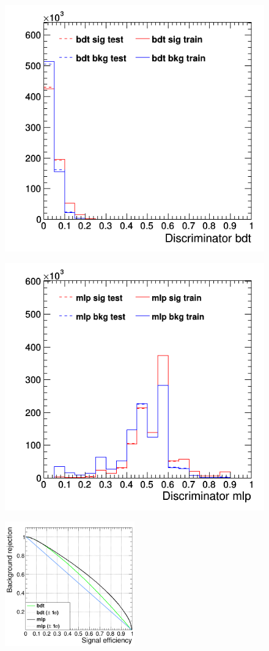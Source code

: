 \documentclass[11pt]{scrartcl}
\begin{document}
	\begin{figure}[H]
	\centering
	\begin{minipage}{.5\textwidth}
	  \centering
	  \includegraphics[width=0.75\linewidth]{figures/MVA/select3/config3/discriminator_bdt.png}
	  \label{fig:distr_s3_config3_bdt}
	\end{minipage}%
	\begin{minipage}{.5\textwidth}
	  \centering
	  \includegraphics[width=0.75\linewidth]{figures/MVA/select3/config3/discriminator_mlp.png}
	  \label{fig:distr_s3_config3_mlp}
	\end{minipage}
	\centering
	\includegraphics[width=0.5\textwidth]{figures/MVA/select3/config3/FOM_selection3_nL10_nT1000_mD5_nC50.png}

\end{figure}
\end{document}
